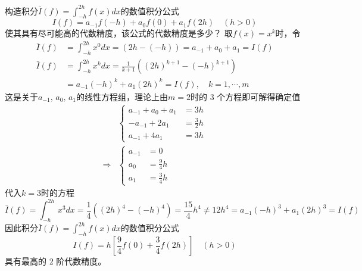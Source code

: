 \documentclass[11pt]{article}
\begin{document}
\begin{question}
    \questiontext
    {
        构造积分$\bar{I}(f) = \displaystyle \int_{-h}^{2h}{f(x)dx}$的数值积分公式
        \begin{equation*}
            I(f) = a_{-1}f(-h) + a_0f(0) + a_1f(2h) \quad (h > 0)
        \end{equation*}
        使其具有尽可能高的代数精度，该公式的代数精度是多少？
    }
    \answer
    {
        取$f(x) = x^k$时，令
        \begin{align*}
            \bar{I}(f) & = \int_{-h}^{2h}{x^0dx} = \left(2h - (-h)\right) = a_{-1} + a_0 + a_1 = I(f)      \\
            \bar{I}(f) & = \int_{-h}^{2h}{x^kdx} = \frac{1}{k + 1}\left((2h)^{k + 1} - (-h)^{k + 1}\right) \\
                       & = a_{-1}(-h)^k + a_1(2h)^k = I(f),\quad k = 1,\cdots, m
        \end{align*}
        这是关于$a_{-1},\, a_0,\, a_1$的线性方程组，理论上由$m = 2$时的 3 个方程即可解得确定值
        \begin{align*}
                        & \left\{
            \begin{aligned}
                a_{-1} + a_0 + a_1 & = 3h           \\
                -a_{-1} + 2a_1     & = \frac{3}{2}h \\
                a_{-1} + 4a_1      & = 3h
            \end{aligned}
            \right.               \\
            \Rightarrow & \left\{
            \begin{aligned}
                a_{-1} & = 0            \\
                a_0    & = \frac{9}{4}h \\
                a_1    & =\frac{3}{4}h
            \end{aligned}
            \right.
        \end{align*}
        代入$k = 3$时的方程
        \begin{equation*}
            \bar{I}(f) = \int_{-h}^{2h}{x^3dx} = \frac{1}{4}\left((2h)^{4} - (-h)^{4}\right) = \frac{15}{4}h^4 \neq 12h^4 = a_{-1}(-h)^3 + a_1(2h)^3 = I(f)
        \end{equation*}
        因此积分$\bar{I}(f) = \displaystyle \int_{-h}^{2h}{f(x)dx}$的数值积分公式
        \begin{equation*}
            I(f) = h\left[\frac{9}{4}f(0) + \frac{3}{4}f(2h)\right] \quad (h > 0)
        \end{equation*}
        具有最高的 2 阶代数精度。
    }
\end{question}
\end{document}
